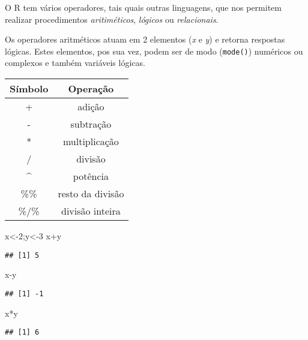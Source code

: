 \documentclass[
]{book}
\newenvironment{Shaded}{\begin{snugshade}}{\end{snugshade}}
\newcommand{\DecValTok}[1]{\textcolor[rgb]{0.00,0.00,0.81}{#1}}
\newcommand{\NormalTok}[1]{#1}
\newcommand{\OtherTok}[1]{\textcolor[rgb]{0.56,0.35,0.01}{#1}}
\newcommand{\SpecialCharTok}[1]{\textcolor[rgb]{0.00,0.00,0.00}{#1}}
\begin{document}
O R tem vários operadores, tais quais outras linguagens, que nos permitem realizar procedimentos \emph{aritiméticos}, \emph{lógicos} ou \emph{relacionais}.

Os operadores aritméticos atuam em 2 elementos (\emph{x} e \emph{y}) e retorna respostas lógicas. Estes elementos, pos sua vez, podem ser de modo (\texttt{mode()}) numéricos ou complexos e também variáveis lógicas.

\begin{longtable}[]{@{}cc@{}}
\toprule
Símbolo & Operação \\
\midrule
\endhead
+ & adição \\
- & subtração \\
* & multiplicação \\
/ & divisão \\
\^{} & potência \\
\%\% & resto da divisão \\
\%/\% & divisão inteira \\
\bottomrule
\end{longtable}

\begin{Shaded}
\begin{Highlighting}[]
\NormalTok{x}\OtherTok{\textless{}{-}}\DecValTok{2}\NormalTok{;y}\OtherTok{\textless{}{-}}\DecValTok{3}
\NormalTok{x}\SpecialCharTok{+}\NormalTok{y}
\end{Highlighting}
\end{Shaded}

\begin{verbatim}
## [1] 5
\end{verbatim}

\begin{Shaded}
\begin{Highlighting}[]
\NormalTok{x}\SpecialCharTok{{-}}\NormalTok{y}
\end{Highlighting}
\end{Shaded}

\begin{verbatim}
## [1] -1
\end{verbatim}

\begin{Shaded}
\begin{Highlighting}[]
\NormalTok{x}\SpecialCharTok{*}\NormalTok{y}
\end{Highlighting}
\end{Shaded}

\begin{verbatim}
## [1] 6
\end{verbatim}
\end{document}

